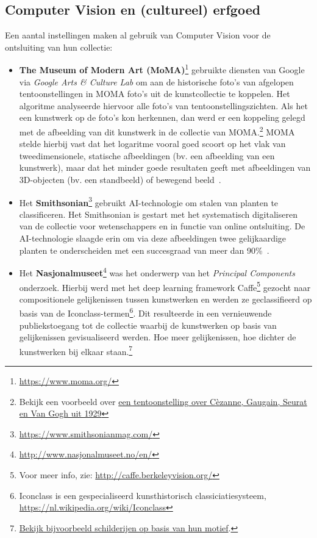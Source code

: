 \documentclass[fleqn,10pt]{voorstel}
\begin{document}
\subsection{Computer Vision en (cultureel) erfgoed}
Een aantal instellingen maken al gebruik van Computer Vision voor de ontsluiting van hun collectie:
\begin{itemize}
	\item \textbf{The Museum of Modern Art (MoMA)}\footnote{\url{https://www.moma.org/}} gebruikte diensten van Google via \emph{Google Arts \& Culture Lab} om aan de historische foto's van afgelopen tentoonstellingen in MOMA foto's uit de kunstcollectie te koppelen. Het algoritme analyseerde hiervoor alle foto's van tentoonstellingszichten. Als het een kunstwerk op de foto's kon herkennen, dan werd er een koppeling gelegd met de afbeelding van dit kunstwerk in de collectie van MOMA.\footnote{Bekijk een voorbeeld over \href{https://www.moma.org/calendar/exhibitions/1767/installation_images/10473}{een tentoonstelling over C\`{e}zanne, Gaugain, Seurat en Van Gogh uit 1929}} MOMA stelde hierbij vast dat het logaritme vooral goed scoort op het vlak van tweedimensionele, statische afbeeldingen (bv. een afbeelding van een kunstwerk), maar dat het minder goede resultaten geeft met afbeeldingen van 3D-objecten (bv. een standbeeld) of bewegend beeld~\autocite{MOMA2018?}.
	
	\item Het \textbf{Smithsonian}\footnote{\url{https://www.smithsonianmag.com/}} gebruikt AI-technologie om stalen van planten te classificeren. Het Smithsonian is gestart met het systematisch digitaliseren van de collectie voor wetenschappers en in functie van online ontsluiting. De AI-technologie slaagde erin om via deze afbeeldingen twee gelijkaardige planten te onderscheiden met een succesgraad van meer dan 90\%~\autocite{Smith2017}.
	
	\item Het \textbf{Nasjonalmuseet}\footnote{\url{http://www.nasjonalmuseet.no/en/}} was het onderwerp van het \emph{Principal Components} onderzoek. Hierbij werd met het deep learning framework Caffe\footnote{Voor meer info, zie: \url{http://caffe.berkeleyvision.org/}} gezocht naar compositionele gelijkenissen tussen kunstwerken en werden ze geclassifieerd op basis van de Iconclass-termen\footnote{Iconclass is een gespecialiseerd kunsthistorisch classiciatiesysteem, \url{https://nl.wikipedia.org/wiki/Iconclass}}. Dit resulteerde in een vernieuwende publiekstoegang tot de collectie waarbij de kunstwerken op basis van gelijkenissen gevisualiseerd werden. Hoe meer gelijkenissen, hoe dichter de kunstwerken bij elkaar staan.\footnote{\href{http://vy.nasjonalmuseet.no/?collection=painting_subject}{Bekijk bijvoorbeeld schilderijen op basis van hun motief}.} \autocites{Nasjonalmuseet2017?}{Westvang2017?}
\end{itemize}
\end{document}

